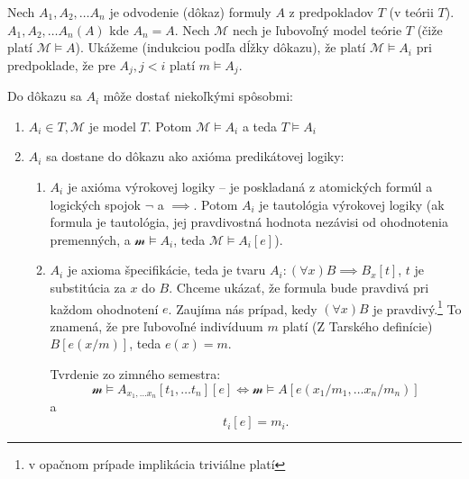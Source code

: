 \begin{dokaz}
    Nech $A_1, A_2, \ldots A_n$ je odvodenie (dôkaz) formuly $A$
    z predpokladov $T$ (v teórii $T$). $A_1, A_2, \ldots A_n(A)$ kde
    $A_n=A$. Nech $\mathcal{M}$ nech je ľubovoľný model teórie $T$ 
    (čiže platí $\mathcal{M} \models A$).
    Ukážeme (indukciou podľa dĺžky dôkazu), že platí $\mathcal{M} \models A_i$
    pri predpoklade, že pre $A_j, j < i$ platí $m \models A_j$.

    Do dôkazu sa $A_i$ môže dostať niekoľkými spôsobmi:
    \begin{enumerate}
    \item $A_i \in T, \mathcal{M}$ je model $T$. Potom 
        $\mathcal{M} \models A_i$ a teda $T \models A_i$

    \item $A_i$ sa dostane do dôkazu ako axióma predikátovej logiky:
    \begin{enumerate}
        \item $A_i$ je axióma výrokovej logiky -- je poskladaná z
            atomických formúl a logických spojok $\neg$ a $\implies$. Potom
            $A_i$ je tautológia výrokovej logiky (ak formula je tautológia,
            jej pravdivostná hodnota nezávisi od ohodnotenia premenných, a
            $\mathcal{m} \models A_i$, teda $\mathcal{M} \models A_i[e]$).

        \item $A_i$ je axioma špecifikácie, teda je tvaru 
            $A_i: (\forall x) B \implies B_x[t]$, 
            $t$ je substitúcia za $x$ do $B$. 
            Chceme ukázať, že formula bude pravdivá
            pri každom ohodnotení $e$.
            Zaujíma nás prípad, kedy $(\forall x) B$ je pravdivý.\footnote{
                v opačnom prípade implikácia triviálne platí}
            To znamená, že pre ľubovoľné indivíduum $m$ platí (Z Tarského
            definície) $B[e(x/m)]$, teda $e(x)=m$.
        
            Tvrdenie zo zimného semestra:
            \begin{equation*}
                \mathcal{m} \models A_{x_1, \ldots x_n}[t_1, \ldots t_n][e] 
                    \Leftrightarrow 
                \mathcal{m} \models A[e(x_1/m_1, \ldots x_n/m_n)]
            \end{equation*}
            a
            \begin{equation*}
              t_i[e] = m_i.
            \end{equation*}


\end{enumerate}
\end{enumerate}
\end{dokaz}
